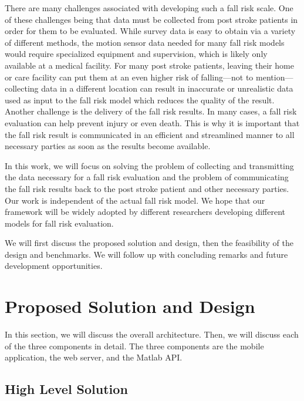 \documentclass[conference]{IEEEtran}
\begin{document}
There are many challenges associated with developing such a fall risk scale. One of these challenges being that data must be collected from post stroke patients in order for them to be evaluated. While survey data is easy to obtain via a variety of different methods, the motion sensor data needed for many fall risk models would require specialized equipment and supervision, which is likely only available at a medical facility. For many post stroke patients, leaving their home or care facility can put them at an even higher risk of falling---not to mention---collecting data in a different location can result in inaccurate or unrealistic data used as input to the fall risk model which reduces the quality of the result. Another challenge is the delivery of the fall risk results. In many cases, a fall risk evaluation can help prevent injury or even death. This is why it is important that the fall risk result is communicated in an efficient and streamlined manner to all necessary parties as soon as the results become available.

In this work, we will focus on solving the problem of collecting and transmitting the data necessary for a fall risk evaluation and the problem of communicating the fall risk results back to the post stroke patient and other necessary parties. Our work is independent of the actual fall risk model. We hope that our framework will be widely adopted by different researchers developing different models for fall risk evaluation. 

We will first discuss the proposed solution and design, then the feasibility of the design and benchmarks. We will follow up with concluding remarks and future development opportunities. 

\section{Proposed Solution and Design}

In this section, we will discuss the overall architecture. Then, we will discuss each of the three components in detail. The three components are the mobile application, the web server, and the Matlab API. 

\subsection{High Level Solution}
\end{document}
